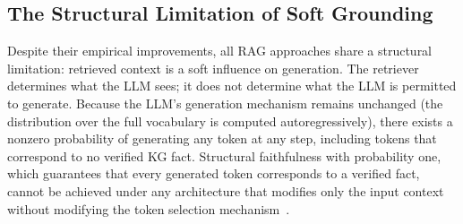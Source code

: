 \subsection{The Structural Limitation of Soft Grounding}

Despite their empirical improvements, all RAG approaches share a structural limitation: retrieved context is a soft influence on generation. The retriever determines what the LLM sees; it does not determine what the LLM is permitted to generate. Because the LLM's generation mechanism remains unchanged (the distribution over the full vocabulary is computed autoregressively), there exists a nonzero probability of generating any token at any step, including tokens that correspond to no verified KG fact. Structural faithfulness with probability one, which guarantees that every generated token corresponds to a verified fact, cannot be achieved under any architecture that modifies only the input context without modifying the token selection mechanism~\citep{luo2025-graph-constrained-reasoning, geng2023grammarconstrained}.

